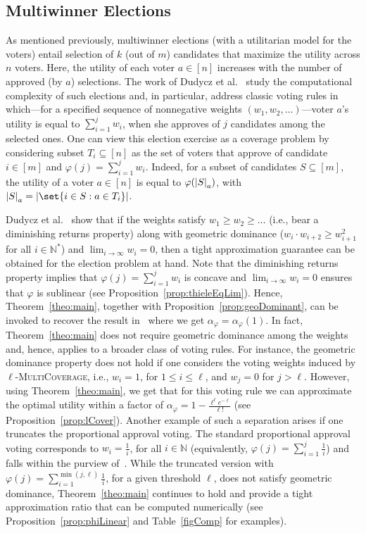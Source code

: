 \subsection{Multiwinner Elections}
\label{subsection:multiwinner-election} 
As mentioned previously, multiwinner elections (with a utilitarian model for the voters) entail selection of $k$ (out of $m$) candidates that maximize the utility across $n$ voters. Here, the utility of each voter $a \in [n]$ increases with the number of approved (by $a$) selections. 
The work of Dudycz et al.~\cite{DMMS20} study the computational complexity of such elections and, in particular, address classic voting rules in which---for a specified sequence of nonnegative weights $(w_1, w_2, \ldots)$---voter $a$'s utility is equal to $\sum_{i=1}^j w_i$, when she approves of $j$ candidates among the selected ones. One can view this election exercise as a coverage problem by considering subset $T_i \subseteq [n]$ as the set of voters that approve of candidate $i \in [m]$ and $\varphi(j) = \sum_{i=1}^j w_i$. Indeed, for a subset of candidates $S \subseteq [m]$, the utility of a voter $a \in [n]$ is equal to $\varphi ( \abs{S}_a)$, with $\abs{S}_a = \abs{\set{i \in S : a \in T_i}}$. 

Dudycz et al.~\cite{DMMS20} show that if the weights satisfy $w_1 \geq w_2 \geq \ldots$ (i.e., bear a  diminishing returns property) along with geometric dominance ($w_{i } \cdot w_{i+2} \geq w_{i+1}^2$ for all $i \in \mathbb{N}^*$) and $\lim_{i \rightarrow \infty} w_i = 0$, then a tight approximation guarantee can be obtained for the election problem at hand. Note that the diminishing returns property implies that $\varphi(j) = \sum_{i=1}^j w_i$ is concave and $\lim_{i \rightarrow \infty} w_i = 0$ ensures that $\varphi$ is sublinear (see Proposition~\ref{prop:thieleEqLim}). Hence, Theorem~\ref{theo:main}, together with Proposition~\ref{prop:geoDominant}, can be invoked to recover the result in~\cite{DMMS20} where we get $\alpha_{\varphi} = \alpha_{\varphi}(1)$. In fact, Theorem~\ref{theo:main} does not require geometric dominance among the weights and, hence, applies to a broader class of voting rules. For instance, the geometric dominance property does not hold if one considers the voting weights induced by $\ell$-\textsc{MultiCoverage}, i.e., $w_i = 1$, for $1 \leq i \leq \ell$, and $w_j = 0$ for $j > \ell$.  However, using Theorem~\ref{theo:main}, we get that for this voting rule we can approximate the optimal utility within a factor of $\alpha_\varphi = 1-\frac{\ell^{\ell}e^{-\ell}}{\ell!}$ (see Proposition~\ref{prop:lCover}). Another example of such a separation arises if one truncates the proportional approval voting. The standard proportional approval voting corresponds to $w_i = \frac{1}{i}$, for all $i \in \mathbb{N}$ (equivalently,  $\varphi(j) = \sum_{i=1}^j \frac{1}{i}$) and falls within the purview of~\cite{DMMS20}. While the truncated version with $\varphi(j) = \sum_{i=1}^{\min(j, \ell)} \frac{1}{i}$, for a given threshold $\ell$, does not satisfy geometric dominance, Theorem~\ref{theo:main} continues to hold and provide a tight approximation ratio that can be computed numerically (see Proposition~\ref{prop:phiLinear} and Table~\ref{figComp} for examples).

